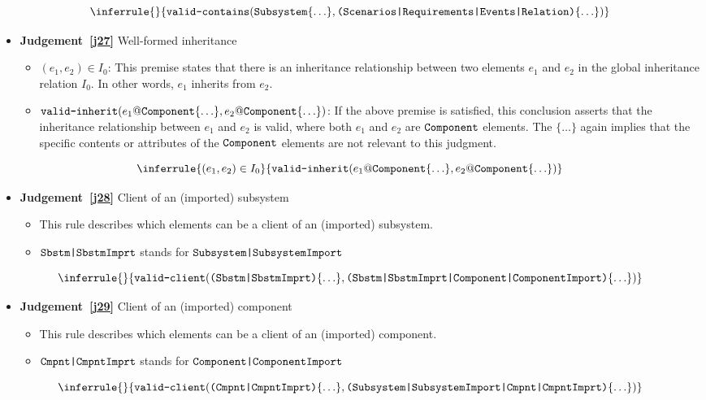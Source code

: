 \documentclass{article}
\begin{document}
\begin{equation}
\label{j26}
\inferrule{
}{\validcontains{\lab{Subsystem}\{\ldots\}}{\lab{(Scenarios|Requirements|Events|Relation)}\{\ldots\}}
}
\end{equation}

\begin{itemize}
\item \textbf{Judgement~\ref{j27}} Well-formed inheritance
\begin{itemize}
\item $(e_1,e_2) \in I_0$: This premise states that there is an inheritance relationship between two elements $e_1$ and $e_2$ in the global inheritance relation $I_0$. In other words, $e_1$ inherits from $e_2$.
\item $\texttt{valid-inherit}({e_1@\texttt{Component}\{\ldots\}},{e_2@\texttt{Component}\{\ldots\}})$: If the above premise is satisfied, this conclusion asserts that the inheritance relationship between $e_1$ and $e_2$ is valid, where both $e_1$ and $e_2$ are $\texttt{Component}$ elements. The $\{\ldots\}$ again implies that the specific contents or attributes of the $\texttt{Component}$ elements are not relevant to this judgment.
\end{itemize}
\end{itemize}

\begin{equation}
\label{j27}
\inferrule{
  (e_1,e_2) \in I_0
}{\validinh{e_1@\lab{Component}\{\ldots\}}{e_2@\lab{Component}\{\ldots\}}
}
\end{equation}

\begin{itemize}
\item \textbf{Judgement~\ref{j28}} Client of an (imported) subsystem
\begin{itemize}
\item This rule describes which elements can be a client of an (imported) subsystem.
\item $\texttt{Sbstm|SbstmImprt}$ stands for $\texttt{Subsystem|SubsystemImport}$
\end{itemize}
\end{itemize}

\begin{equation}
\label{j28}
\inferrule{
}{\validclient{\lab{(Sbstm|SbstmImprt)}\{\ldots\}}{\lab{(Sbstm|SbstmImprt|Component|ComponentImport)}\{\ldots\}}
}
\end{equation}

\begin{itemize}
\item \textbf{Judgement~\ref{j29}} Client of an (imported) component
\begin{itemize}
\item This rule describes which elements can be a client of an (imported) component.
\item $\texttt{Cmpnt|CmpntImprt}$ stands for $\texttt{Component|ComponentImport}$
\end{itemize}
\end{itemize}

\begin{equation}
\label{j29}
\inferrule{
}{\validclient{\lab{(Cmpnt|CmpntImprt)}\{\ldots\}}{\lab{(Subsystem|SubsystemImport|Cmpnt|CmpntImprt)}\{\ldots\}}
}
\end{equation}
\end{document}
